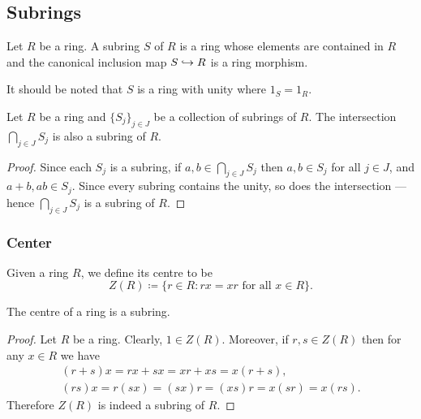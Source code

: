 \subsection{Subrings}

%
\begin{definition}[Subring]
\label{def:subring}
Let \(R\) be a ring. A subring \(S\) of \(R\) is a ring whose elements are
contained in \(R\) and the canonical inclusion map \(S \hookrightarrow R\) is a ring
morphism.
\end{definition}
%

%
\begin{remark}
\label{rem:subring-same-unity}
It should be noted that \(S\) is a ring with unity where \(1_S = 1_R\).
\end{remark}
%

%
\begin{proposition}
\label{prop:intersection-subring-is-subring}
Let \(R\) be a ring and \(\{S_{j}\}_{j \in J}\) be a collection of subrings of
\(R\). The intersection \(\bigcap_{j \in J} S_j\) is also a subring of \(R\).
\end{proposition}
%

%
\begin{proof}
Since each \(S_j\) is a subring, if \(a, b \in \bigcap_{j \in J} S_j\) then \(a,
b \in S_j\) for all \(j \in J\), and \(a + b, a b \in S_j\). Since every subring
contains the unity, so does the intersection --- hence \(\bigcap_{j \in J} S_j\)
is a subring of \(R\).
\end{proof}
%


\subsubsection{Center}

%
\begin{definition}[Center]
\label{def:ring-center}
Given a ring \(R\), we define its centre to be
\[
Z(R) \coloneq \{r \in R \colon r x = x r \text{ for all } x \in R\}.
\]
\end{definition}
%

%
\begin{corollary}
\label{cor:center-is-subring}
The centre of a ring is a subring.
\end{corollary}
%

%
\begin{proof}
Let \(R\) be a ring. Clearly, \(1 \in Z(R)\). Moreover, if \(r, s \in Z(R)\)
then for any \(x \in R\) we have
\begin{gather*}
(r + s) x = r x + s x = x r + x s = x (r + s), \\
(r s) x = r(s x) = (s x) r = (x s) r = x (s r) = x (r s).
\end{gather*}
Therefore \(Z(R)\) is indeed a subring of \(R\).
\end{proof}
%

